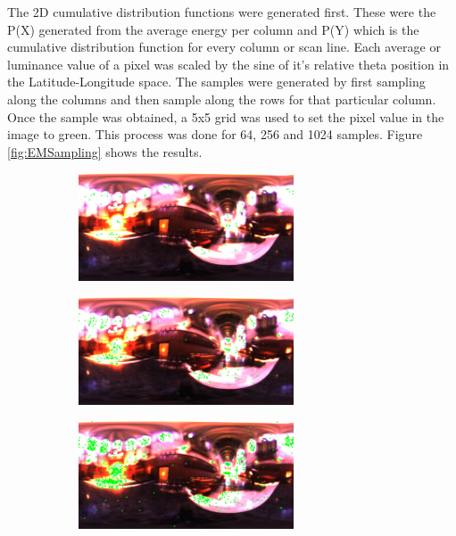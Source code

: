 \documentclass[fleqn, hidelinks]{article} %
\begin{document}
The 2D cumulative distribution functions were generated first. These were the P(X) generated from the average energy per column and P(Y) which is the cumulative distribution function for every column or scan line. Each average or luminance value of a pixel was scaled by the sine of it's relative theta position in the Latitude-Longitude space. The samples were generated by first sampling along the columns and then sample along the rows for that particular column. Once the sample was obtained, a 5x5 grid was used to set the pixel value in the image to green. This process was done for 64, 256 and 1024 samples. Figure \ref{fig:EMSampling} shows the results.

\begin{figure}
        \centering
        \begin{subfigure}[b]{\textwidth}
                \centering
                \includegraphics[width=0.7\textwidth]{imgs/Part2/env64.png}
                \caption{}
                \label{fig:env64}
        \end{subfigure}
        \begin{subfigure}[b]{\textwidth}
                \centering
                \includegraphics[width=0.7\textwidth]{imgs/Part2/env256.png}
                \caption{}
                \label{fig:env256}
        \end{subfigure}
        \begin{subfigure}[b]{\textwidth}
                \centering
                \includegraphics[width=0.7\textwidth]{imgs/Part2/env1024.png}

\end{subfigure}
\end{figure}
\end{document}
